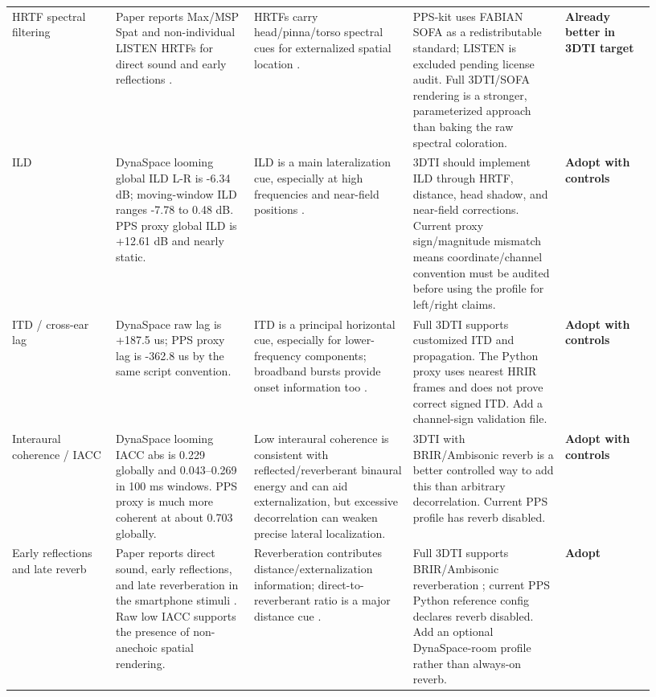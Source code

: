 \documentclass[10pt]{article}
\newcommand{\statuskeep}{\textbf{Adopt}}
\newcommand{\statusmodify}{\textbf{Adopt with controls}}
\newcommand{\statusalready}{\textbf{Already better in 3DTI target}}
\begin{document}
\begin{longtable}{P{0.15\linewidth} P{0.20\linewidth} P{0.23\linewidth} P{0.22\linewidth} P{0.13\linewidth}}
HRTF spectral filtering & Paper reports Max/MSP Spat and non-individual LISTEN HRTFs for direct sound and early reflections \cite{roussel2025}. & HRTFs carry head/pinna/torso spectral cues for externalized spatial location \cite{carlini2024}. & PPS-kit uses FABIAN SOFA as a redistributable standard; LISTEN is excluded pending license audit. Full 3DTI/SOFA rendering is a stronger, parameterized approach than baking the raw spectral coloration. & \statusalready\\
ILD & DynaSpace looming global ILD L-R is -6.34 dB; moving-window ILD ranges -7.78 to 0.48 dB. PPS proxy global ILD is +12.61 dB and nearly static. & ILD is a main lateralization cue, especially at high frequencies and near-field positions \cite{carlini2024}. & 3DTI should implement ILD through HRTF, distance, head shadow, and near-field corrections. Current proxy sign/magnitude mismatch means coordinate/channel convention must be audited before using the profile for left/right claims. & \statusmodify\\
ITD / cross-ear lag & DynaSpace raw lag is +187.5 us; PPS proxy lag is -362.8 us by the same script convention. & ITD is a principal horizontal cue, especially for lower-frequency components; broadband bursts provide onset information too \cite{carlini2024}. & Full 3DTI supports customized ITD and propagation. The Python proxy uses nearest HRIR frames and does not prove correct signed ITD. Add a channel-sign validation file. & \statusmodify\\
Interaural coherence / IACC & DynaSpace looming IACC abs is 0.229 globally and 0.043--0.269 in 100 ms windows. PPS proxy is much more coherent at about 0.703 globally. & Low interaural coherence is consistent with reflected/reverberant binaural energy and can aid externalization, but excessive decorrelation can weaken precise lateral localization. & 3DTI with BRIR/Ambisonic reverb is a better controlled way to add this than arbitrary decorrelation. Current PPS profile has reverb disabled. & \statusmodify\\
Early reflections and late reverb & Paper reports direct sound, early reflections, and late reverberation in the smartphone stimuli \cite{roussel2025}. Raw low IACC supports the presence of non-anechoic spatial rendering. & Reverberation contributes distance/externalization information; direct-to-reverberant ratio is a major distance cue \cite{kolarik2016,carlini2024}. & Full 3DTI supports BRIR/Ambisonic reverberation \cite{cuevas2019}; current PPS Python reference config declares reverb disabled. Add an optional DynaSpace-room profile rather than always-on reverb. & \statuskeep\\

\end{longtable}
\end{document}
